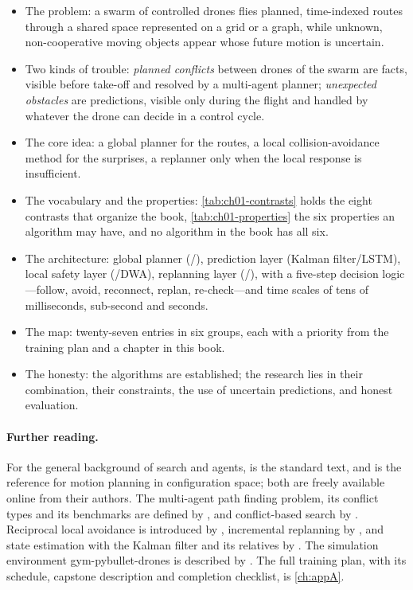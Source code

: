 \begin{summary}
\begin{itemize}
  \item The problem: a swarm of controlled drones flies planned, time-indexed routes
        through a shared space represented on a grid or a graph, while unknown,
        non-cooperative moving objects appear whose future motion is uncertain.
  \item Two kinds of trouble: \emph{planned conflicts} between drones of the swarm are
        facts, visible before take-off and resolved by a multi-agent planner;
        \emph{unexpected obstacles} are predictions, visible only during the flight and
        handled by whatever the drone can decide in a control cycle.
  \item The core idea: a global planner for the routes, a local collision-avoidance
        method for the surprises, a replanner only when the local response is
        insufficient.
  \item The vocabulary and the properties: \cref{tab:ch01-contrasts} holds the eight
        contrasts that organize the book, \cref{tab:ch01-properties} the six properties
        an algorithm may have, and no algorithm in the book has all six.
  \item The architecture: global planner (\cbs/\ecbs), prediction layer
        (Kalman filter/LSTM), local safety layer (\orca/DWA), replanning layer
        (\dstarlite/\astar), with a five-step decision logic---follow, avoid,
        reconnect, replan, re-check---and time scales of tens of milliseconds,
        sub-second and seconds.
  \item The map: twenty-seven entries in six groups, each with a priority from the
        training plan and a chapter in this book.
  \item The honesty: the algorithms are established; the research lies in their
        combination, their constraints, the use of uncertain predictions, and honest
        evaluation.
\end{itemize}
\end{summary}

\paragraph{Further reading.}
For the general background of search and agents, \textcite{russell2020aima} is the
standard text, and \textcite{lavalle2006planning} is the reference for motion
planning in configuration space; both are freely available online from their
authors. The multi-agent path finding problem, its conflict types and its benchmarks
are defined by \textcite{stern2019mapf}, and conflict-based search by
\textcite{sharon2015cbs}. Reciprocal local avoidance is introduced by
\textcite{vandenberg2011orca}, incremental replanning by
\textcite{koenig2002dstarlite}, and state estimation with the Kalman filter and its
relatives by \textcite{thrun2005probabilistic}. The simulation environment
gym-pybullet-drones is described by \textcite{panerati2021learning}. The full training
plan, with its schedule, capstone description and completion checklist, is
\cref{ch:appA}.

